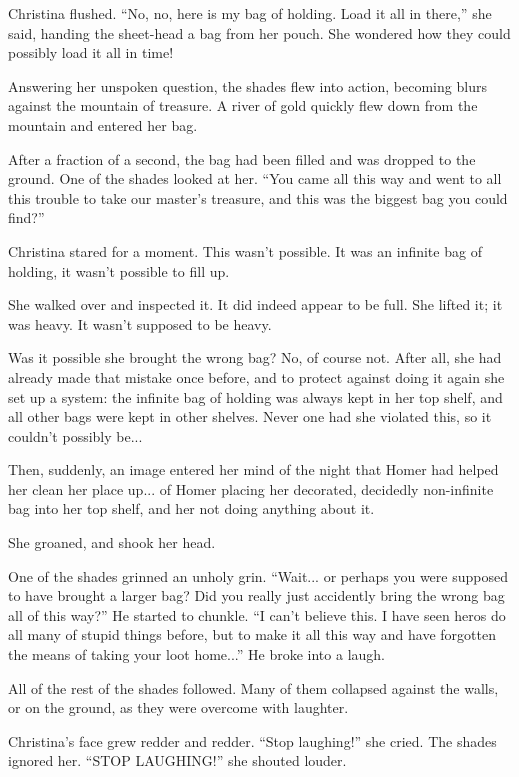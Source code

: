 \documentclass[showtrims,b6paper,draft,10pt]{memoir}
\begin{document}
Christina flushed.  ``No, no, here is my bag of holding.  Load it all in there,'' she said, handing the sheet-head a bag from her pouch.  She wondered how they could possibly load it all in time!

Answering her unspoken question, the shades flew into action, becoming blurs against the mountain of treasure.  A river of gold quickly flew down from the mountain and entered her bag.

After a fraction of a second, the bag had been filled and was dropped to the ground.  One of the shades looked at her.  ``You came all this way and went to all this trouble to take our master's treasure, and this was the biggest bag you could find?''

Christina stared for a moment.  This wasn't possible.  It was an infinite bag of holding, it wasn't possible to fill up.

She walked over and inspected it.  It did indeed appear to be full.  She lifted it;  it was heavy.  It wasn't supposed to be heavy.

Was it possible she brought the wrong bag?  No, of course not.  After all, she had already made that mistake once before, and to protect against doing it again she set up a system:  the infinite bag of holding was always kept in her top shelf, and all other bags were kept in other shelves.  Never one had she violated this, so it couldn't possibly be...

Then, suddenly, an image entered her mind of the night that Homer had helped her clean her place up... of Homer placing her decorated, decidedly non-infinite bag into her top shelf, and her not doing anything about it.

She groaned, and shook her head.

One of the shades grinned an unholy grin.  ``Wait... or perhaps you were supposed to have brought a larger bag?  Did you really just accidently bring the wrong bag all of this way?''  He started to chunkle.  ``I can't believe this.  I have seen heros do all many of stupid things before, but to make it all this way and have forgotten the means of taking your loot home...''  He broke into a laugh.

All of the rest of the shades followed.  Many of them collapsed against the walls, or on the ground, as they were overcome with laughter.

Christina's face grew redder and redder.  ``Stop laughing!'' she cried.  The shades ignored her.  ``STOP LAUGHING!'' she shouted louder.
\end{document}
